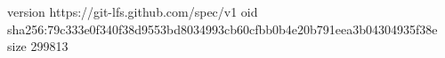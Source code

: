 version https://git-lfs.github.com/spec/v1
oid sha256:79c333e0f340f38d9553bd8034993cb60cfbb0b4e20b791eea3b04304935f38e
size 299813
